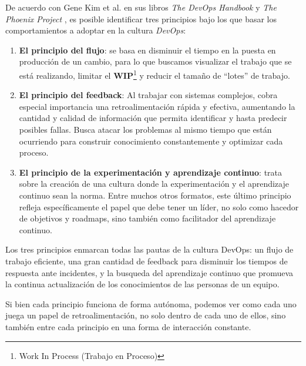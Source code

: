 \documentclass[journal]{IEEEtran}
\begin{document}
De acuerdo con Gene Kim et al. en sus libros \textit{The DevOps Handbook} \cite{kim2021devops} y \textit{The Phoenix Project} \cite{kim2018phoenix}, es posible identificar tres principios bajo los que basar los comportamientos a adoptar en la cultura \textit{DevOps}:
\begin{enumerate}
    \item \textbf{El principio del flujo}\cite[Part 1.2: The First Way: The Principles of Flow]{kim2021devops}: se basa en disminuir el tiempo en la puesta en producción de un cambio, para lo que buscamos visualizar el trabajo que se está realizando, limitar el \textbf{WIP}\footnote{Work In Process (Trabajo en Proceso)} y reducir el tamaño de ``lotes'' de trabajo.
    \item \textbf{El principio del feedback}\cite[Part 1.3: The Second Way: The Principles of Feedback]{kim2021devops}: Al trabajar con sistemas complejos, cobra especial importancia una retroalimentación rápida y efectiva, aumentando la cantidad y calidad de información que permita identificar y hasta predecir posibles fallas. Busca atacar los problemas al mismo tiempo que están ocurriendo para construir conocimiento constantemente y optimizar cada proceso.
    \item \textbf{El principio de la experimentación y aprendizaje continuo}\cite[Part 1.4: The Third Way: The Principles of Continual Learning and Experimentation]{kim2021devops}: trata sobre la creación de una cultura donde la experimentación y el aprendizaje continuo sean la norma. Entre muchos otros formatos, este último principio refleja específicamente el papel que debe tener un líder, no solo como hacedor de objetivos y roadmaps, sino también como facilitador del aprendizaje continuo.
\end{enumerate}

Los tres principios enmarcan todas las pautas de la cultura DevOps: un flujo de trabajo eficiente, una gran cantidad de feedback para disminuir los tiempos de respuesta ante incidentes, y la busqueda del aprendizaje continuo que promueva la continua actualización de los conocimientos de las personas de un equipo. 

Si bien cada principio funciona de forma autónoma, podemos ver como cada uno juega un papel de retroalimentación, no solo dentro de cada uno de ellos, sino también entre cada principio en una forma de interacción constante. 

\end{document}
